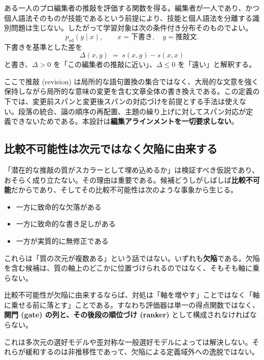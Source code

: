 \documentclass[a4paper,10.5pt]{ltjsarticle}
\begin{document}
ある一人のプロ編集者の推敲を評価する関数を得る。編集者が一人であり、かつ個人語法そのものが技能であるという前提により、技能と個人語法を分離する識別問題は生じない。したがって学習対象は次の条件付き分布そのものでよい。
\[
  p_{\mathrm{ed}}(y \mid x), \qquad x = \text{下書き},\quad y = \text{推敲文}.
\]
下書きを基準とした差を
\begin{equation}
  \Delta(x,y) \;=\; s(x,y) - s(x,x)
  \label{eq:delta}
\end{equation}
と書き、$\Delta > 0$ を「この編集者の推敲に近い」、$\Delta \le 0$ を「遠い」と解釈する。

ここで推敲 (revision) は局所的な語句置換の集合ではなく、大局的な文意を強く保持しながら局所的な意味の変更を含む文章全体の書き換えである。この定義の下では、変更前スパンと変更後スパンの対応づけを前提とする手法は使えない。段落の統合、論の順序の再配置、主題の繰り上げに対してスパン対応が定義できないためである。本設計は\textbf{編集アラインメントを一切要求しない}。

\subsection{比較不可能性は次元ではなく欠陥に由来する}

「潜在的な推敲の質がスカラーとして埋め込めるか」は検証すべき仮説であり、おそらく成り立たない。その理由は重要である。候補どうしがしばしば\textbf{比較不可能}だからであり、そしてその比較不可能性は次のような事象から生じる。

\begin{itemize}
  \item 一方に致命的な欠落がある
  \item 一方に致命的な書き足しがある
  \item 一方が実質的に無修正である
\end{itemize}

これらは「質の次元が複数ある」という話ではない。いずれも\textbf{欠陥}である。欠陥を含む候補は、質の軸上のどこかに位置づけられるのではなく、そもそも軸に乗らない。

\begin{keybox}[title=設計上の中心的帰結]
比較不可能性が欠陥に由来するならば、対処は「軸を増やす」ことではなく「軸に乗せる前に落とす」ことである。すなわち評価器は単一の得点関数ではなく、\textbf{関門 (gate) の列と、その後段の順位づけ (ranker)} として構成されなければならない。

これは多次元の選好モデルや歪対称な一般選好モデルによっては解決しない。それらが緩和するのは非推移性であって、欠陥による定義域外への逸脱ではない。
\end{keybox}
\end{document}
